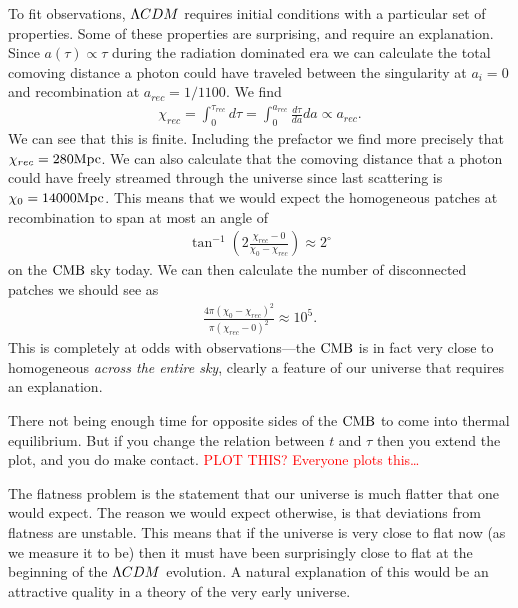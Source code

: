     To fit observations, $\Lambda CDM$ requires initial conditions with a particular set of properties.
    Some of these properties are surprising, and require an explanation.
    Since $a(\tau)\propto \tau$ during the radiation dominated era we can calculate
    the total comoving distance a photon could have traveled between the singularity at $a_i=0$
    and recombination at $a_{rec}=1/1100$. We find
    \begin{align}
        \chi_{rec} = \int_{0}^{\tau_{rec}} d \tau = \int_{0}^{a_{rec}} \frac{d\tau}{da}da \propto a_{rec}.
    \end{align}
    We can see that this is finite.
    Including the prefactor we find more precisely that $\chi_{rec}=280\text{Mpc}$.
    We can also calculate that the comoving distance that a photon could have
    freely streamed through the universe since
    last scattering is $\chi_0=14000\text{Mpc}$.
    This means that we would expect the homogeneous patches at recombination to span
    at most an angle of
    \begin{align}
        \tan^{-1}\left(2\frac{\chi_{rec}-0}{\chi_{0}-\chi_{rec}}\right) \approx 2^{\circ}
    \end{align}
    on the $\text{CMB}$ sky today. We can then calculate the number of disconnected patches
    we should see as
    \begin{align}
        \frac{4\pi(\chi_{0}-\chi_{rec})^2}{\pi(\chi_{rec}-0)^2} \approx 10^5.
    \end{align}
    This is completely at odds with observations---the $\text{CMB}$ is in fact very close to
    homogeneous \textit{across the entire sky}, clearly a feature of our universe
    that requires an explanation.


    There not being enough time for opposite
    sides of the $\text{CMB}$ to come into thermal equilibrium. But if you change the relation between
    $t$ and $\tau$ then you extend the plot, and you do make contact.
    \textcolor{red}{PLOT THIS? Everyone plots this\ldots}


    The flatness problem is the statement that our universe is much flatter that one would expect.
    The reason we would expect otherwise, is that deviations from flatness are unstable.
    This means that if the universe is very close to flat now (as we measure it to be)
    then it must have been surprisingly close to flat at the beginning of the $\Lambda CDM$
    evolution. A natural explanation of this would be an attractive quality in a
    theory of the very early universe.


